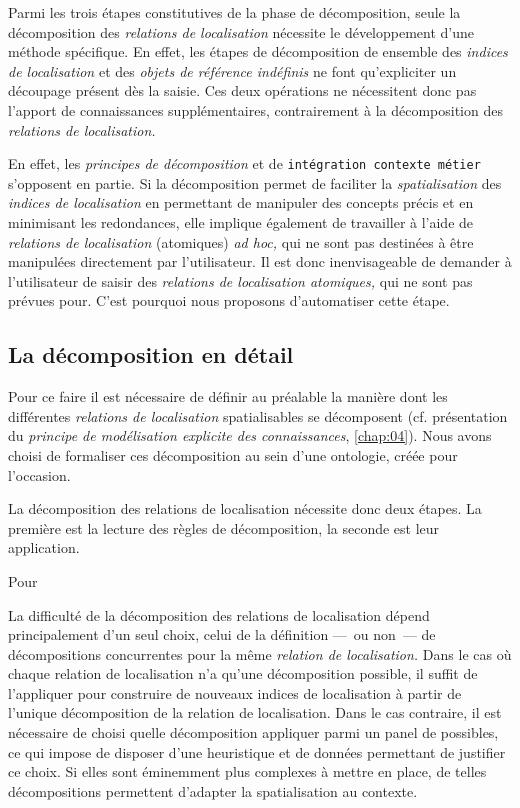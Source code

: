 Parmi les trois étapes constitutives de la phase de décomposition,
seule la décomposition des \emph{relations de localisation} nécessite
le développement d'une méthode spécifique. En effet, les étapes de
décomposition de ensemble des \emph{indices de localisation} et des
\emph{objets de référence indéfinis} ne font qu'expliciter un
découpage présent dès la saisie. Ces deux opérations ne nécessitent
donc pas l'apport de connaissances supplémentaires, contrairement à la
décomposition des \emph{relations de localisation.}

En effet, les \emph{principes de décomposition} et de
\texttt{intégration contexte métier} s'opposent en partie. Si la
décomposition permet de faciliter la \emph{spatialisation} des
\emph{indices de localisation} en permettant de manipuler des concepts
précis et en minimisant les redondances, elle implique également de
travailler à l'aide de \emph{relations de localisation} (atomiques)
\emph{ad hoc,} qui ne sont pas destinées à être manipulées directement
par l'utilisateur. Il est donc inenvisageable de demander à
l'utilisateur de saisir des \emph{relations de localisation
  atomiques,} qui ne sont pas prévues pour. C'est pourquoi nous
proposons d'automatiser cette étape.

\subsection{La décomposition en détail}

Pour ce faire il est nécessaire de définir au préalable la manière
dont les différentes \emph{relations de localisation} spatialisables
se décomposent (cf. présentation du \emph{principe de modélisation
  explicite des connaissances}, \autoref{chap:04}). Nous avons choisi
de formaliser ces décomposition au sein d'une ontologie, créée pour
l'occasion.

La décomposition des relations de localisation nécessite donc deux
étapes. La première est la lecture des règles de décomposition, la
seconde est leur application.


Pour 


La difficulté de la décomposition des relations de localisation dépend
principalement d'un seul choix, celui de la définition ---~ou non~---
de décompositions concurrentes pour la même \emph{relation de
  localisation.} Dans le cas où chaque relation de localisation n'a
qu'une décomposition possible, il suffit de l'appliquer pour
construire de nouveaux indices de localisation à partir de l'unique
décomposition de la relation de localisation. Dans le cas contraire,
il est nécessaire de choisi quelle décomposition appliquer parmi un
panel de possibles, ce qui impose de disposer d'une heuristique et de
données permettant de justifier ce choix. Si elles sont éminemment
plus complexes à mettre en place, de telles décompositions permettent
d’adapter la spatialisation au contexte.

